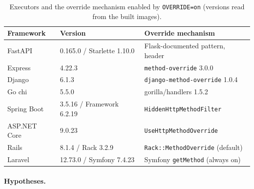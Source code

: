 \begin{table}[h]
\caption{Executors and the override mechanism enabled by \texttt{OVERRIDE=on}
(versions read from the built images).}
\label{tab:exec}
\scriptsize
\setlength{\tabcolsep}{3pt}
\begin{tabular}{@{}l l l@{}}
\toprule
Framework & Version & Override mechanism \\
\midrule
FastAPI & 0.165.0 / Starlette 1.10.0 & Flask-documented pattern, header \\
Express & 4.22.3 & \texttt{method-override} 3.0.0 \\
Django & 6.1.3 & \texttt{django-method-override} 1.0.4 \\
Go chi & 5.5.0 & gorilla/handlers 1.5.2 \\
Spring Boot & 3.5.16 / Framework 6.2.19 & \texttt{HiddenHttpMethodFilter} \\
ASP.NET Core & 9.0.23 & \texttt{UseHttpMethodOverride} \\
Rails & 8.1.4 / Rack 3.2.9 & \texttt{Rack::MethodOverride} (default) \\
Laravel & 12.73.0 / Symfony 7.4.23 & Symfony \texttt{getMethod} (always on) \\
\bottomrule
\end{tabular}
\end{table}

\paragraph{Hypotheses.}

